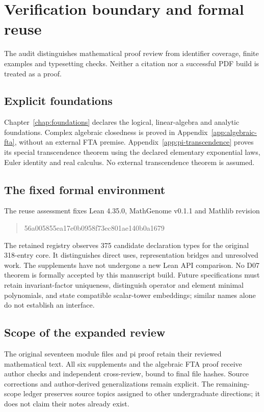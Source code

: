 \chapter{Verification boundary and formal reuse}
\label{app:verification}
The audit distinguishes mathematical proof review from identifier coverage,
finite examples and typesetting checks. Neither a citation nor a successful
PDF build is treated as a proof.

\section{Explicit foundations}
Chapter~\ref{chap:foundations} declares the logical, linear-algebra and
analytic foundations. Complex algebraic closedness is proved in
Appendix~\ref{app:algebraic-fta}, without an external FTA premise.
Appendix~\ref{app:pi-transcendence} proves its special transcendence theorem
using the declared elementary exponential laws, Euler identity and real
calculus. No external transcendence theorem is assumed.

\section{The fixed formal environment}
The reuse assessment fixes Lean 4.35.0, MathGenome v0.1.1 and Mathlib revision
\begin{quote}\small\ttfamily
56a005855ea17e0b0958f73ec801ae140b0a1679
\end{quote}
The retained registry observes 375 candidate declaration types for the
original 318-entry core. It distinguishes direct uses, representation
bridges and unresolved work. The supplements have not undergone a new
Lean API comparison. No D07 theorem is formally accepted by this manuscript
build. Future specifications must retain invariant-factor uniqueness,
distinguish operator and element minimal polynomials, and state compatible
scalar-tower embeddings; similar names alone do not establish an interface.

\section{Scope of the expanded review}
The original seventeen module files and pi proof retain their reviewed
mathematical text. All six supplements and the algebraic FTA proof receive
author checks and independent cross-review, bound to final file hashes.
Source corrections and author-derived generalizations remain explicit.
The remaining-scope ledger preserves source topics assigned to other
undergraduate directions; it does not claim their notes already exist.
